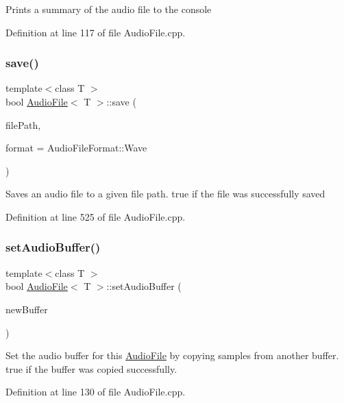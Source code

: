 Prints a summary of the audio file to the console 

Definition at line 117 of file Audio\+File.\+cpp.

\mbox{\label{classAudioFile_a415239cad5b54b4fef4a210ab79911e3}} 
\subsubsection{\texorpdfstring{save()}{save()}}
{\footnotesize\ttfamily template$<$class T $>$ \\
bool \hyperlink{classAudioFile}{Audio\+File}$<$ T $>$\+::save (\begin{DoxyParamCaption}\item[{std\+::string}]{file\+Path,  }\item[{\hyperlink{AudioFile_8h_ad18559d169602e85d0ad68da6ef8593f}{Audio\+File\+Format}}]{format = {\ttfamily AudioFileFormat\+:\+:Wave} }\end{DoxyParamCaption})}

Saves an audio file to a given file path.  true if the file was successfully saved 

Definition at line 525 of file Audio\+File.\+cpp.

\mbox{\label{classAudioFile_afa0a0f7d576b0597c938c5a89746636e}} 
\subsubsection{\texorpdfstring{set\+Audio\+Buffer()}{setAudioBuffer()}}
{\footnotesize\ttfamily template$<$class T $>$ \\
bool \hyperlink{classAudioFile}{Audio\+File}$<$ T $>$\+::set\+Audio\+Buffer (\begin{DoxyParamCaption}\item[{Audio\+Buffer \&}]{new\+Buffer }\end{DoxyParamCaption})}

Set the audio buffer for this \hyperlink{classAudioFile}{Audio\+File} by copying samples from another buffer.  true if the buffer was copied successfully. 

Definition at line 130 of file Audio\+File.\+cpp.

